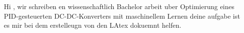 Hi , wir schreiben en wissenschaftlich Bachelor arbeit uber 
Optimierung eines PID-gesteuerten DC-DC-Konverters mit maschinellem Lernen
deine aufgabe ist es mir bei dem erstelleugn von den LAtex dokuemnt helfen.
